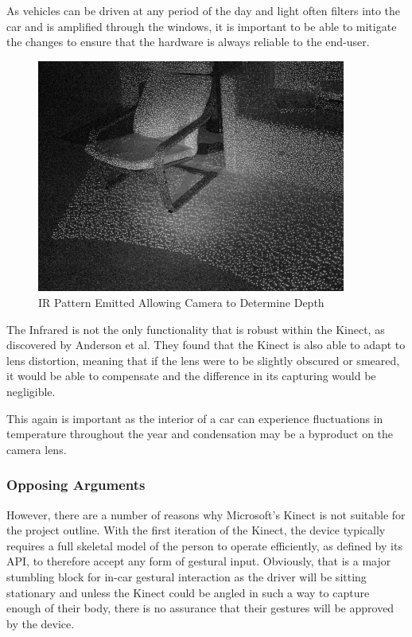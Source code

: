 \documentclass{l4proj}
\begin{document}
As vehicles can be driven at any period of the day and light often filters into the car and is amplified through the windows, it is important to be able to mitigate the changes to ensure that the hardware is always reliable to the end-user.
\begin{figure}[h!]
\centering
\includegraphics[width=4in]{images/irpattern.jpg}
\caption{IR Pattern Emitted Allowing Camera to Determine Depth}
\label{fig:irpattern}
\end{figure}

The Infrared is not the only functionality that is robust within the Kinect, as discovered by Anderson et al\cite{}. They found that the Kinect is also able to adapt to lens distortion, meaning that if the lens were to be slightly obscured or smeared, it would be able to compensate and the difference in its capturing would be negligible. 

This again is important as the interior of a car can experience fluctuations in temperature throughout the year and condensation may be a byproduct on the camera lens.

\subsubsection{Opposing Arguments}
\vspace{-3mm}
However, there are a number of reasons why Microsoft’s Kinect is not suitable for the project outline. With the first iteration of the Kinect, the device typically requires a full skeletal model of the person to operate efficiently, as defined by its API, to therefore accept any form of gestural input. Obviously, that is a major stumbling block for in-car gestural interaction as the driver will be sitting stationary and unless the Kinect could be angled in such a way to capture enough of their body, there is no assurance that their gestures will be approved by the device.
\end{document}
